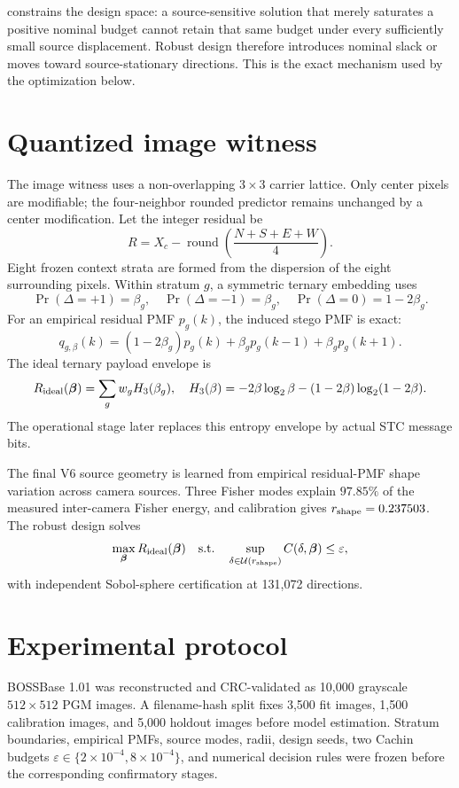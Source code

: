 \documentclass[10pt]{article}
\begin{document}
 constrains the design space: a source-sensitive solution that merely saturates a positive nominal budget cannot retain that same budget under every sufficiently small source displacement. Robust design therefore introduces nominal slack or moves toward source-stationary directions. This is the exact mechanism used by the optimization below.

\section{Quantized image witness}
The image witness uses a non-overlapping \(3\times3\) carrier lattice. Only center pixels are modifiable; the four-neighbor rounded predictor remains unchanged by a center modification. Let the integer residual be
\[
R=X_c-\operatorname{round}\!\left(\frac{N+S+E+W}{4}\right).
\]
Eight frozen context strata are formed from the dispersion of the eight surrounding pixels. Within stratum \(g\), a symmetric ternary embedding uses
\[
\Pr(\Delta=+1)=\beta_g,\quad
\Pr(\Delta=-1)=\beta_g,\quad
\Pr(\Delta=0)=1-2\beta_g.
\]
For an empirical residual PMF \(p_g(k)\), the induced stego PMF is exact:
\begin{equation}
q_{g,\beta}(k)
=(1-2\beta_g)p_g(k)
+\beta_gp_g(k-1)
+\beta_gp_g(k+1).
\label{eq:pmfchannel}
\end{equation}
The ideal ternary payload envelope is
\begin{equation}
R_{\rm ideal}(\boldsymbol\beta)
=
\sum_g w_g H_3(\beta_g),
\quad
H_3(\beta)=-2\beta\log_2\beta-(1-2\beta)\log_2(1-2\beta).
\label{eq:idealrate}
\end{equation}
The operational stage later replaces this entropy envelope by actual STC message bits.

The final V6 source geometry is learned from empirical residual-PMF shape variation across camera sources. Three Fisher modes explain \(97.85\%\) of the measured inter-camera Fisher energy, and calibration gives \(r_{\rm shape}=0.237503\). The robust design solves
\begin{equation}
\max_{\boldsymbol\beta}R_{\rm ideal}(\boldsymbol\beta)
\quad\text{s.t.}\quad
\sup_{\delta\in\mathcal U(r_{\rm shape})}
C(\delta,\boldsymbol\beta)\le\varepsilon,
\label{eq:robustopt}
\end{equation}
with independent Sobol-sphere certification at 131,072 directions.

\section{Experimental protocol}
BOSSBase 1.01 was reconstructed and CRC-validated as 10,000 grayscale \(512\times512\) PGM images. A filename-hash split fixes 3,500 fit images, 1,500 calibration images, and 5,000 holdout images before model estimation. Stratum boundaries, empirical PMFs, source modes, radii, design seeds, two Cachin budgets \(\varepsilon\in\{2\times10^{-4},8\times10^{-4}\}\), and numerical decision rules were frozen before the corresponding confirmatory stages.
\end{document}
